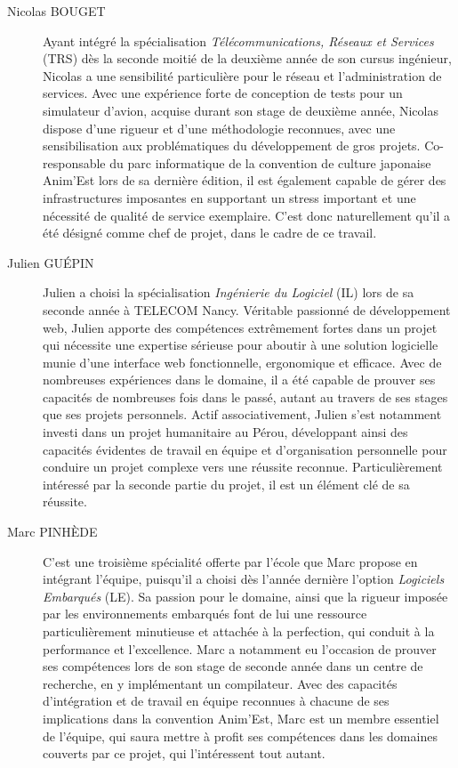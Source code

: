 \begin{description}
\item[Nicolas BOUGET] Ayant intégré la spécialisation \textit{Télécommunications, Réseaux et Services} (TRS) dès la seconde moitié de la deuxième année de son cursus ingénieur, Nicolas a une sensibilité particulière pour le réseau et l'administration de services. Avec une expérience forte de conception de tests pour un simulateur d'avion, acquise durant son stage de deuxième année, Nicolas dispose d'une rigueur et d'une méthodologie reconnues, avec une sensibilisation aux problématiques du développement de gros projets. Co-responsable du parc informatique de la convention de culture japonaise Anim'Est lors de sa dernière édition, il est également capable de gérer des infrastructures imposantes en supportant un stress important et une nécessité de qualité de service exemplaire. C'est donc naturellement qu'il a été désigné comme chef de projet, dans le cadre de ce travail.\\
\item[Julien GUÉPIN] Julien a choisi la spécialisation \textit{Ingénierie du Logiciel} (IL) lors de sa seconde année à TELECOM Nancy. Véritable passionné de développement web, Julien apporte des compétences extrêmement fortes dans un projet qui nécessite une expertise sérieuse pour aboutir à une solution logicielle munie d'une interface web fonctionnelle, ergonomique et efficace. Avec de nombreuses expériences dans le domaine, il a été capable de prouver ses capacités de nombreuses fois dans le passé, autant au travers de ses stages que ses projets personnels. Actif associativement, Julien s'est notamment investi dans un projet humanitaire au Pérou, développant ainsi des capacités évidentes de travail en équipe et d'organisation personnelle pour conduire un projet complexe vers une réussite reconnue. Particulièrement intéressé par la seconde partie du projet, il est un élément clé de sa réussite.\\
\item[Marc PINHÈDE] C'est une troisième spécialité offerte par l'école que Marc propose en intégrant l'équipe, puisqu'il a choisi dès l'année dernière l'option \textit{Logiciels Embarqués} (LE). Sa passion pour le domaine, ainsi que la rigueur imposée par les environnements embarqués font de lui une ressource particulièrement minutieuse et attachée à la perfection, qui conduit à la performance et l'excellence. Marc a notamment eu l'occasion de prouver ses compétences lors de son stage de seconde année dans un centre de recherche, en y implémentant un compilateur. Avec des capacités d'intégration et de travail en équipe reconnues à chacune de ses implications dans la convention Anim'Est, Marc est un membre essentiel de l'équipe, qui saura mettre à profit ses compétences dans les domaines couverts par ce projet, qui l'intéressent tout autant.\\

\end{description}
